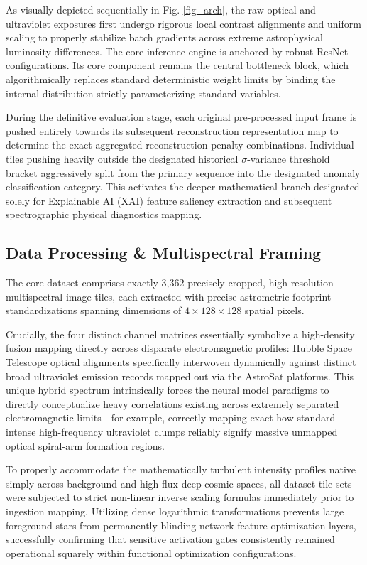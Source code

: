 \documentclass[conference]{IEEEtran}
\begin{document}
As visually depicted sequentially in Fig. \ref{fig_arch}, the raw optical and ultraviolet exposures first undergo rigorous local contrast alignments and uniform scaling to properly stabilize batch gradients across extreme astrophysical luminosity differences. The core inference engine is anchored by robust ResNet configurations. Its core component remains the central bottleneck block, which algorithmically replaces standard deterministic weight limits by binding the internal distribution strictly parameterizing standard variables. 

During the definitive evaluation stage, each original pre-processed input frame is pushed entirely towards its subsequent reconstruction representation map to determine the exact aggregated reconstruction penalty combinations. Individual tiles pushing heavily outside the designated historical $\sigma$-variance threshold bracket aggressively split from the primary sequence into the designated anomaly classification category. This activates the deeper mathematical branch designated solely for Explainable AI (XAI) feature saliency extraction and subsequent spectrographic physical diagnostics mapping.

\subsection{Data Processing \& Multispectral Framing}
The core dataset comprises exactly 3,362 precisely cropped, high-resolution multispectral image tiles, each extracted with precise astrometric footprint standardizations spanning dimensions of $4 \times 128 \times 128$ spatial pixels. 

Crucially, the four distinct channel matrices essentially symbolize a high-density fusion mapping directly across disparate electromagnetic profiles: Hubble Space Telescope optical alignments specifically interwoven dynamically against distinct broad ultraviolet emission records mapped out via the AstroSat platforms. This unique hybrid spectrum intrinsically forces the neural model paradigms to directly conceptualize heavy correlations existing across extremely separated electromagnetic limits—for example, correctly mapping exact how standard intense high-frequency ultraviolet clumps reliably signify massive unmapped optical spiral-arm formation regions.

To properly accommodate the mathematically turbulent intensity profiles native simply across background and high-flux deep cosmic spaces, all dataset tile sets were subjected to strict non-linear inverse scaling formulas immediately prior to ingestion mapping. Utilizing dense logarithmic transformations prevents large foreground stars from permanently blinding network feature optimization layers, successfully confirming that sensitive activation gates consistently remained operational squarely within functional optimization configurations.
\end{document}
